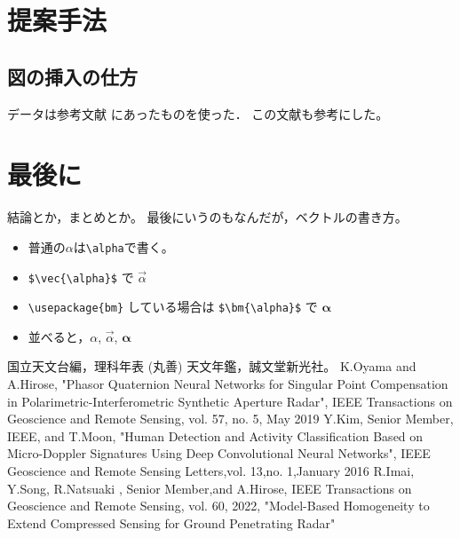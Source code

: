 \documentclass[a4paper,12pt]{jsreport}
\begin{document}
\chapter{提案手法}

\section{図の挿入の仕方}
データは参考文献\cite{rika} にあったものを使った．
この文献\cite{ten}も参考にした。


\chapter{最後に}

結論とか，まとめとか。
最後にいうのもなんだが，ベクトルの書き方。
\begin{itemize}
\item 普通の$\alpha$は\verb|\alpha|で書く。
\item \verb|$\vec{\alpha}$| で $\vec{\alpha}$
\item \verb|\usepackage{bm}| している場合は
\verb|$\bm{\alpha}$| で $\bm{\alpha}$
\item 並べると，$\alpha$, $\vec{\alpha}$, $\bm{\alpha}$
\end{itemize}

\begin{thebibliography}{99}
   国立天文台編，理科年表 (丸善)
   天文年鑑，誠文堂新光社。
  K.Oyama and A.Hirose, "Phasor Quaternion Neural Networks for Singular
  Point Compensation in Polarimetric-Interferometric
  Synthetic Aperture Radar", IEEE Transactions on Geoscience and Remote Sensing, vol. 57, no. 5, May 2019
  Y.Kim,  Senior Member, IEEE, and T.Moon, "Human Detection and Activity Classification Based
  on Micro-Doppler Signatures Using Deep
  Convolutional Neural Networks", IEEE Geoscience and Remote Sensing Letters,vol. 13,no. 1,January 2016
  R.Imai, Y.Song, R.Natsuaki , Senior Member,and A.Hirose, IEEE Transactions on Geoscience and Remote Sensing, vol. 60, 2022, 
  "Model-Based Homogeneity to Extend Compressed Sensing for Ground Penetrating Radar"

 
  \end{thebibliography}
  
  
\end{document}
